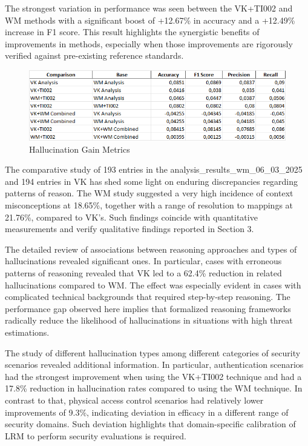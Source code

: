 \documentclass[sigconf]{acmart}
\begin{document}
The strongest variation in performance was seen between the VK+TI002 and WM methods with a significant boost of +12.67\% in accuracy and a +12.49\% increase in F1 score. This result highlights the synergistic benefits of improvements in methods, especially when those improvements are rigorously verified against pre-existing reference standards.

\begin{figure}[htbp]
    \centering
    \includegraphics[width=0.7\linewidth]{hallucination_gain.png}
    \caption{Hallucination Gain Metrics}
    \label{fig:enter-label}
\end{figure}

The comparative study of 193 entries in the analysis\allowbreak\_results\allowbreak\_wm\allowbreak\_06\allowbreak\_03\allowbreak\_2025 and 194 entries in VK has shed some light on enduring discrepancies regarding patterns of reason. The WM study suggested a very high incidence of context misconceptions at 18.65\%, together with a range of resolution to mappings at 21.76\%, compared to VK's. Such findings coincide with quantitative measurements and verify qualitative findings reported in Section 3.

The detailed review of associations between reasoning approaches and types of hallucinations revealed significant ones. In particular, cases with erroneous patterns of reasoning revealed that VK led to a 62.4\% reduction in related hallucinations compared to WM. The effect was especially evident in cases with complicated technical backgrounds that required step-by-step reasoning. The performance gap observed here implies that formalized reasoning frameworks radically reduce the likelihood of hallucinations in situations with high threat estimations.

The study of different hallucination types among different categories of security scenarios revealed additional information. In particular, authentication scenarios had the strongest improvement when using the VK+TI002 technique and had a 17.8\% reduction in hallucination rates compared to using the WM technique. In contrast to that, physical access control scenarios had relatively lower improvements of 9.3\%, indicating deviation in efficacy in a different range of security domains. Such deviation highlights that domain-specific calibration of LRM to perform security evaluations is required.
\end{document}

